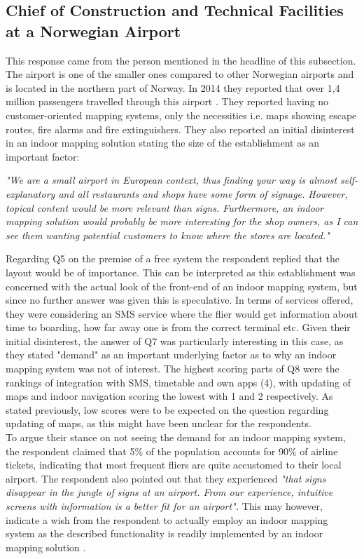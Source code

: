\subsection{Chief of Construction and Technical Facilities at a Norwegian Airport}
This response came from the person mentioned in the headline of this subsection. The airport is one of the smaller ones compared to other Norwegian airports and is located in the northern part of Norway. In 2014 they reported that over 1,4 million passengers travelled through this airport \cite{avinor2014}. They reported having no customer-oriented mapping systems, only the necessities i.e. maps showing escape routes, fire alarms and fire extinguishers. They also reported an initial disinterest in an indoor mapping solution stating the size of the establishment as an important factor:
\begin{displayquote}
\textit{"We are a small airport in European context, thus finding your way is almost self-explanatory and all restaurants and shops have some form of signage. However, topical content would be more relevant than signs. Furthermore, an indoor mapping solution would probably be more interesting for the shop owners, as I can see them wanting potential customers to know where the stores are located."}
\end{displayquote}
Regarding Q5 on the premise of a free system the respondent replied that the layout would be of importance. This can be interpreted as this establishment was concerned with the actual look of the front-end of an indoor mapping system, but since no further answer was given this is speculative. In terms of services offered, they were considering an SMS service where the flier would get information about time to boarding, how far away one is from the correct terminal etc. Given their initial disinterest, the answer of Q7 was particularly interesting in this case, as they stated "demand" as an important underlying factor as to why an indoor mapping system was not of interest. The highest scoring parts of Q8 were the rankings of integration with SMS, timetable and own apps (4), with updating of maps and indoor navigation scoring the lowest with 1 and 2 respectively. As stated previously, low scores were to be expected on the question regarding updating of maps, as this might have been unclear for the respondents. 
\newline
\\
To argue their stance on not seeing the demand for an indoor mapping system, the respondent claimed that 5\% of the population accounts for 90\% of airline tickets, indicating that most frequent fliers are quite accustomed to their local airport. The respondent also pointed out that they experienced \textit{"that signs disappear in the jungle of signs at an airport. From our experience, intuitive screens with information is a better fit for an airport".} This may however, indicate a wish from the respondent to actually employ an indoor mapping system as the described functionality is readily implemented by an indoor mapping solution \cite{mazemap2015}.

